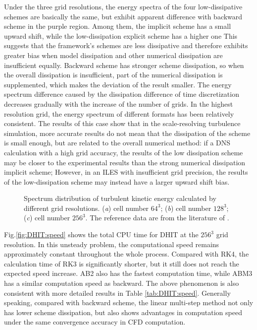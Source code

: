 \documentclass{article}
\begin{document}
Under the three grid resolutions, the energy spectra of the four low-dissipative schemes are basically the same, but exhibit apparent difference with backward scheme in the purple region. Among them, the implicit scheme has a small upward shift, while the low-dissipation explicit scheme has a higher one This suggests that the framework's schemes are less dissipative and therefore exhibits greater bias when model dissipation and other numerical dissipation are insufficient equally. Backward scheme has stronger scheme dissipation, so when the overall dissipation is insufficient, part of the numerical dissipation is supplemented, which makes the deviation of the result smaller. The energy spectrum difference caused by the dissipation difference of time discretization decreases gradually with the increase of the number of grids. In the highest resolution grid, the energy spectrum of different formats has been relatively consistent. The results of this case show that in the scale-resolving turbulence simulation, more accurate results do not mean that the dissipation of the scheme is small enough, but are related to the overall numerical method: if a DNS calculation with a high grid accuracy, the results of the low dissipation scheme may be closer to the experimental results than the strong numerical dissipation implicit scheme; However, in an ILES with insufficient grid precision, the results of the low-dissipation scheme may instead have a larger upward shift bias.

\begin{figure}
	\centering
	\caption{Spectrum distribution of turbulent kinetic energy calculated by different grid resolutions. (\textit{a}) cell number $64^3$; (\textit{b}) cell number $128^3$; (\textit{c}) cell number $256^3$. The reference data are from the literature of \citet{CBC:1971}.}
	\label{fig:DHIT:spectra}
\end{figure}

Fig.\ref{fig:DHIT:speed} shows the total CPU time for DHIT at the $256^3$ grid resolution. In this unsteady problem, the computational speed remains approximately constant throughout the whole process. Compared with RK4, the calculation time of RK3 is significantly shorter, but it still does not reach the expected speed increase. AB2 also has the fastest computation time, while ABM3 has a similar computation speed as backward. The above phenomenon is also consistent with more detailed results in Table \ref{tab:DHIT:speed}. Generally speaking, compared with backward scheme, the linear multi-step method not only has lower scheme dissipation, but also shows advantages in computation speed under the same convergence accuracy in CFD computation.
\end{document}
